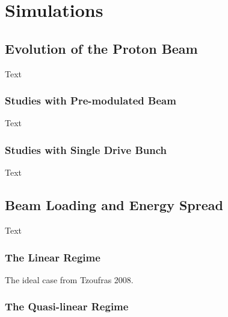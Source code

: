 %
%

\chapter{Simulations}
\label{Ch:Sim}

\section{Evolution of the Proton Beam}
\label{Sim:PBeam}

Text

\subsection{Studies with Pre-modulated Beam}
\label{Sim:PBPreMod}

Text

\subsection{Studies with Single Drive Bunch}
\label{Sim:PBSingle}

Text

\section{Beam Loading and Energy Spread}
\label{Sim:BLoad}

Text

\subsection{The Linear Regime}
\label{Sim:Lin}

The ideal case from Tzoufras 2008.

\subsection{The Quasi-linear Regime}
\label{Sim:QLin}

